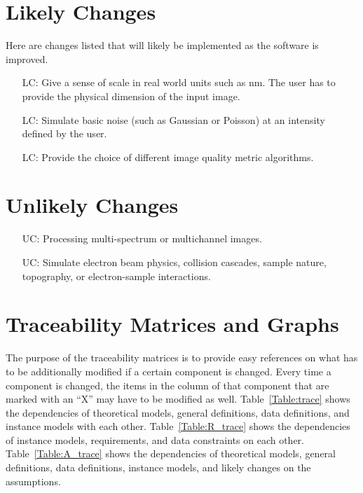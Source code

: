 \documentclass[12pt]{article}
\newcounter{lcnum} %
\newcounter{ucnum} %
\begin{document}
\section{Likely Changes}    
Here are changes listed that will likely be implemented as the software is improved.

\noindent \begin{itemize}

\item[LC\refstepcounter{lcnum}\thelcnum\label{LC_realUnits}:] Give a sense of scale in real world units such as \si{nm}. The user has to provide the physical dimension of the input image.

\item[LC\refstepcounter{lcnum}\thelcnum\label{LC_simNoise}:] Simulate basic noise (such as Gaussian or Poisson) at an intensity defined by the user.

\item[LC\refstepcounter{lcnum}\thelcnum\label{LC_imgMetricAlgos}:] Provide the choice of different image quality metric algorithms.

\end{itemize}

\section{Unlikely Changes}    

\noindent \begin{itemize}

\item[UC\refstepcounter{ucnum}\theucnum\label{UC_multichannel}:] Processing multi-spectrum or multichannel images.

\item[UC\refstepcounter{ucnum}\theucnum\label{UC_physics}:] Simulate electron beam physics, collision cascades, sample nature, topography, or electron-sample interactions.

\end{itemize}

\section{Traceability Matrices and Graphs}

The purpose of the traceability matrices is to provide easy references on what
has to be additionally modified if a certain component is changed. Every time a
component is changed, the items in the column of that component that are marked
with an ``X'' may have to be modified as well. Table~\ref{Table:trace} shows the
dependencies of theoretical models, general definitions, data definitions, and
instance models with each other. Table~\ref{Table:R_trace} shows the
dependencies of instance models, requirements, and data constraints on each
other. Table~\ref{Table:A_trace} shows the dependencies of theoretical models,
general definitions, data definitions, instance models, and likely changes on
the assumptions.
\end{document}
